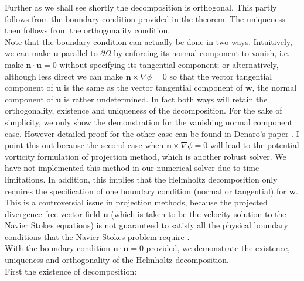 Further as we shall see shortly the decomposition is orthogonal. This partly follows from the boundary condition provided in the theorem. The uniqueness then follows from the orthogonality condition.\\
 
Note that the boundary condition can actually be done in two ways. Intuitively, we can make $\textbf{u}$ parallel to $\partial \Omega$ by enforcing its normal component to vanish, i.e. make $\textbf{n} \cdot \textbf{u} = 0$ without specifying its tangential component; or alternatively, although less direct we can make $\textbf{n} \times \nabla \phi = 0$ so that the vector tangential component of $\textbf{u}$ is the same as the vector tangential component of $\textbf{w}$, the normal component of $\textbf{u}$ is rather undetermined. In fact both ways will retain the orthogonality, existence and uniqueness of the decomposition. For the sake of simplicity, we only show the demonstration for the vanishing normal component case. However detailed proof for the other case can be found in Denaro's paper \cite{maria2003application}. I point this out because the second case when  $\textbf{n} \times \nabla \phi = 0$ will lead to the potential vorticity formulation of projection method, which is another robust solver. We have not implemented this method in our numerical solver due to time limitations. In addition, this implies that the Helmholtz decomposition only requires the specification of one boundary condition (normal or tangential) for $\textbf{w}$. This is a controversial issue in projection methods, because the projected divergence free vector field $\textbf{u}$ (which is taken to be the velocity solution to the Navier Stokes equations) is not guaranteed to satisfy all the physical boundary conditions that the Navier Stokes problem require \cite{maria2003application}.\\

With the boundary condition $\textbf{n} \cdot \textbf{u} = 0$ provided, we demonstrate the existence, uniqueness and orthogonality of the Helmholtz decomposition.\\

First the existence of decomposition:\\

